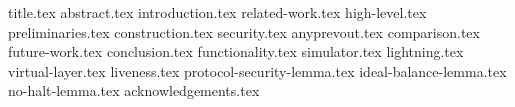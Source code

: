 \documentclass{llncs}
\begin{document}
\pagestyle{plain}


{title.tex}
{abstract.tex}
{introduction.tex}
{related-work.tex}
{high-level.tex}
{preliminaries.tex}
{construction.tex}
{security.tex}
{anyprevout.tex}
{comparison.tex}
{future-work.tex}
{conclusion.tex}
{functionality.tex}
{simulator.tex}
{lightning.tex}
{virtual-layer.tex}
{liveness.tex}
{protocol-security-lemma.tex}
{ideal-balance-lemma.tex}
{no-halt-lemma.tex}
{acknowledgements.tex}


\end{document}
